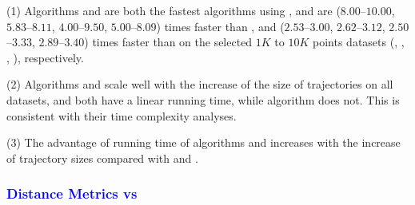 {%

\ni(1) Algorithms \cist and \cista are both the fastest \lsa algorithms using \sed,
and are {($8.00$--$10.00$, $5.83$--$8.11$, $4.00$--$9.50$, $5.00$--$8.09$) times faster than \dps,
	and {($2.53$--$3.00$, $2.62$--$3.12$, $2.50$--$3.33$, $2.89$--$3.40$)}} times faster than \squishe on the selected $1K$ to $10K$ points datasets (\sercar,
\geolife, \mopsi, \pricar), respectively.

\ni(2) Algorithms \cist and \cista scale well with the increase of the size of trajectories on all datasets,
and both have a linear running time, while algorithm \dps does not.
This is consistent with their time complexity analyses.

\ni(3) The advantage of running time of algorithms \cist and \cista increases with the increase of trajectory sizes compared with \dps and \squishe.



\subsubsection{\textcolor{blue}{Distance Metrics \ped vs \sed}}


}
